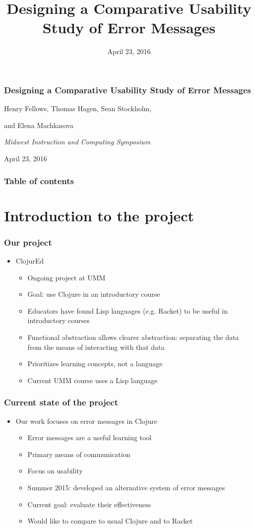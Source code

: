 \documentclass{beamer}
\begin{document}
\title{Designing a Comparative Usability Study of Error Messages}
\date{April 23, 2016}

\begin{frame}
\frametitle{Designing a Comparative Usability Study of Error Messages}
{\centering
\noindent
Henry Fellows, Thomas Hagen, Sean Stockholm, \par
and Elena Machkasova \par

{\it 
Midwest Instruction and Computing Symposium\par
April 23, 2016\par}
}
\end{frame}

\begin{frame}
\frametitle{Table of contents}
\tableofcontents  
\end{frame}

\section{Introduction to the project}

\begin{frame}
\frametitle{Our project}
	\begin{itemize}
		\item ClojurEd
			\begin{itemize}
				\item Ongoing project at UMM
				\item Goal: use Clojure in an introductory course
				\item Educators have found Lisp languages (e.g. Racket) to be useful in introductory courses
				\item Functional abstraction allows clearer abstraction: separating the data from the means of interacting with that data
				\item Prioritizes learning concepts, not a language
				\item Current UMM course uses a Lisp language 
			\end{itemize}
	\end{itemize}
\end{frame}


\begin{frame}
\frametitle{Current state of the project}
	\begin{itemize}
		\item Our work focuses on error messages in Clojure
			\begin{itemize}
				\item Error messages are a useful learning tool
				\item Primary means of communication
				\item Focus on usability
				\item Summer 2015: developed an alternative system of error messages
				\item Current goal: evaluate their effectiveness
				\item Would like to compare to usual Clojure and to Racket
			\end{itemize}
	\end{itemize}
\end{frame}
\end{document}
